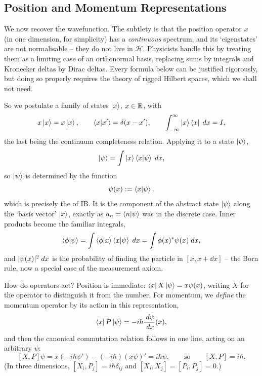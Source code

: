\documentclass[a4paper]{scrartcl}
\begin{document}
\subsection{Position and Momentum Representations}\label{sec:reps}

We now recover the wavefunction. The subtlety is that the position operator $x$ (in one dimension, for simplicity) has a \emph{continuous} spectrum, and its `eigenstates' are not normalisable -- they do not live in $\mathcal{H}$. Physicists handle this by treating them as a limiting case of an orthonormal basis, replacing sums by integrals and Kronecker deltas by Dirac deltas. Every formula below can be justified rigorously, but doing so properly requires the theory of rigged Hilbert spaces, which we shall not need.

So we postulate a family of states $\ket{x}$, $x \in \mathbb{R}$, with
$$
x \ket{x} = x\ket{x}, \qquad \braket{x}{x'} = \delta(x - x'), \qquad \int_{-\infty}^{\infty} \ket{x}\bra{x} \; d x = I,
$$
the last being the continuum completeness relation. Applying it to a state $\ket{\psi}$,
$$
\ket{\psi} = \int \ket{x}\braket{x}{\psi} \; d x,
$$
so $\ket{\psi}$ is determined by the function
$$
\psi(x) := \braket{x}{\psi},
$$
which is precisely the  of IB. It is the component of the abstract state $\ket{\psi}$ along the `basis vector' $\ket{x}$, exactly as $a_n = \braket{n}{\psi}$ was in the discrete case. Inner products become the familiar integrals,
$$
\braket{\phi}{\psi} = \int \braket{\phi}{x}\braket{x}{\psi} \; d x = \int \phi(x)^* \psi(x) \; d x,
$$
and $\lvert\psi(x)\rvert^2 \; d x$ is the probability of finding the particle in $[x, x+\dd x]$ -- the Born rule, now a special case of the measurement axiom.

How do operators act? Position is immediate: $\bra{x} X \ket{\psi} = x \psi(x)$, writing $X$ for the operator to distinguish it from the number. For momentum, we \emph{define} the momentum operator by its action in this representation,
$$
\bra{x}P\ket{\psi} = -i\hbar \frac{\; d \psi}{\; d x}(x),
$$
and then the canonical commutation relation follows in one line, acting on an arbitrary $\psi$:
$$
[X,P]\psi = x(-i\hbar \psi') - (-i\hbar)(x\psi)' = i\hbar \psi, \qquad \text{so} \qquad [X,P] = i\hbar.
$$
(In three dimensions, $[X_i, P_j] = i\hbar \delta_{ij}$ and $[X_i,X_j] = [P_i,P_j] = 0$.)
\end{document}
